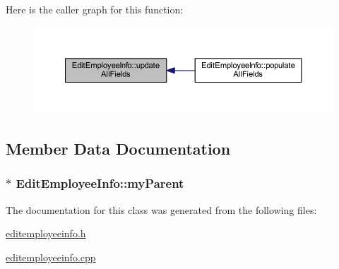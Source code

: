 Here is the caller graph for this function\+:
\nopagebreak
\begin{figure}[H]
\begin{center}
\leavevmode
\includegraphics[width=350pt]{class_edit_employee_info_a1cabc3ae692500c1069ade2499cb37a9_icgraph}
\end{center}
\end{figure}




\subsection{Member Data Documentation}
\hypertarget{class_edit_employee_info_a293b4baa9990327ef11daafc107abca7}{}
\subsubsection[{my\+Parent}]{$\ast$ Edit\+Employee\+Info\+::my\+Parent}\label{class_edit_employee_info_a293b4baa9990327ef11daafc107abca7}


The documentation for this class was generated from the following files\+:\begin{DoxyCompactItemize}
\item 
\hyperlink{editemployeeinfo_8h}{editemployeeinfo.\+h}\item 
\hyperlink{editemployeeinfo_8cpp}{editemployeeinfo.\+cpp}\end{DoxyCompactItemize}
